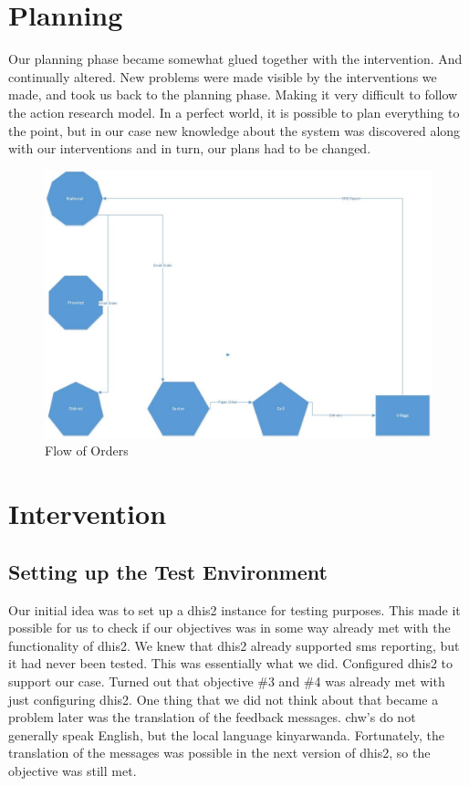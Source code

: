\section{Planning}

Our planning phase became somewhat glued together with the intervention. And continually altered. New problems were made visible by the interventions we made, and took us back to the planning phase. Making it very difficult to follow the action research model. In a perfect world, it is possible to plan everything to the point, but in our case new knowledge about the system was discovered along with our interventions and in turn, our plans had to be changed. 

\begin{figure}
\centering
\includegraphics[width=\textwidth]{case/img/orderFlow}
\caption{Flow of Orders}
\label{fig:chworder}
\end{figure}

\section{Intervention}

\subsection{Setting up the Test Environment}
Our initial idea was to set up a \gls{dhis2} instance for testing purposes. This made it possible for us to check if our objectives was in some way already met with the functionality of \gls{dhis2}. We knew that \gls{dhis2} already supported \gls{sms} reporting, but it had never been tested. This was essentially what we did. Configured \gls{dhis2} to support our case. Turned out that objective \#3 and \#4 was already met with just configuring \gls{dhis2}. One thing that we did not think about that became a problem later was the translation of the feedback messages. \gls{chw}'s do not generally speak English, but the local language kinyarwanda. Fortunately, the translation of the messages was possible in the next version of \gls{dhis2}, so the objective was still met. 


